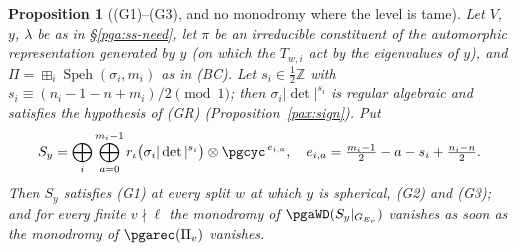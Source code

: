 \documentclass[10pt]{amsart}
\newtheorem{proposition}[theorem]{Proposition}
\theoremstyle{definition}
\theoremstyle{remark}
\newcommand{\Z}{\mathbb Z}
\begin{document}
\begin{proposition}[(G1)--(G3), and no monodromy where the level is tame]\label{pga:G123}
Let $V$, $y$, $\lambda$ be as in \S\ref{pga:ss-need}, let $\pi$ be an irreducible constituent of
the automorphic representation generated by $y$ (on which the $T_{w,i}$ act by the eigenvalues
of $y$), and $\Pi=\boxplus_i\operatorname{Speh}(\sigma_i,m_i)$ as in (BC). Let $s_i\in\frac12\Z$
with $s_i\equiv(n_i-1-n+m_i)/2\pmod1$; then $\sigma_i|\det|^{s_i}$ is regular algebraic and satisfies
the hypothesis of (GR) (Proposition~\ref{pax:sign}). Put
\[
S_y=\bigoplus_i\bigoplus_{a=0}^{m_i-1}r_\iota\bigl(\sigma_i|\det|^{s_i}\bigr)\otimes\pgcyc^{\,e_{i,a}},
\quad e_{i,a}=\tfrac{m_i-1}2-a-s_i+\tfrac{n_i-n}2.
\]
Then $S_y$ satisfies (G1) at every split $w$ at which $y$ is spherical, (G2) and (G3); and for
every finite $v\nmid\ell$ the monodromy of $\pgaWD(S_y|_{G_{E_v}})$ vanishes as soon as the
monodromy of $\pgarec(\Pi_v)$ vanishes.
\end{proposition}
\end{document}
